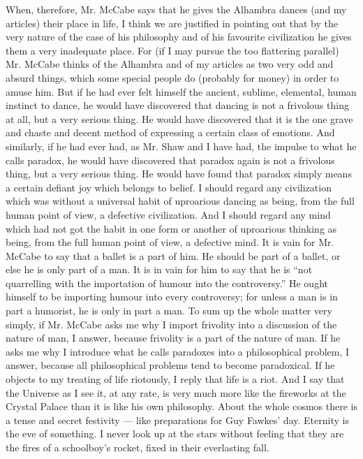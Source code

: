 When, therefore, Mr. McCabe says that he gives the Alhambra dances (and my articles) their place in life, I think we are justified in pointing out that by the very nature of the case of his philosophy and of his favourite civilization he gives them a very inadequate place. For (if I may pursue the too flattering parallel) Mr. McCabe thinks of the Alhambra and of my articles as two very odd and absurd things, which some special people do (probably for money) in order to amuse him. But if he had ever felt himself the ancient, sublime, elemental, human instinct to dance, he would have discovered that dancing is not a frivolous thing at all, but a very serious thing. He would have discovered that it is the one grave and chaste and decent method of expressing a certain class of emotions. And similarly, if he had ever had, as Mr. Shaw and I have had, the impulse to what he calls paradox, he would have discovered that paradox again is not a frivolous thing, but a very serious thing. He would have found that paradox simply means a certain defiant joy which belongs to belief. I should regard any civilization which was without a universal habit of uproarious dancing as being, from the full human point of view, a defective civilization. And I should regard any mind which had not got the habit in one form or another of uproarious thinking as being, from the full human point of view, a defective mind. It is vain for Mr. McCabe to say that a ballet is a part of him. He should be part of a ballet, or else he is only part of a man. It is in vain for him to say that he is “not quarrelling with the importation of humour into the controversy.” He ought himself to be importing humour into every controversy; for unless a man is in part a humorist, he is only in part a man. To sum up the whole matter very simply, if Mr. McCabe asks me why I import frivolity into a discussion of the nature of man, I answer, because frivolity is a part of the nature of man. If he asks me why I introduce what he calls paradoxes into a philosophical problem, I answer, because all philosophical problems tend to become paradoxical. If he objects to my treating of life riotously, I reply that life is a riot. And I say that the Universe as I see it, at any rate, is very much more like the fireworks at the Crystal Palace than it is like his own philosophy. About the whole cosmos there is a tense and secret festivity — like preparations for Guy Fawkes’ day. Eternity is the eve of something. I never look up at the stars without feeling that they are the fires of a schoolboy’s rocket, fixed in their everlasting fall.


